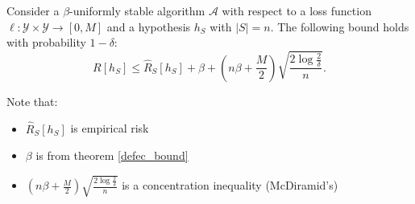 \documentclass{article}
\begin{document}
\begin{thm}\label{risk_bound}
Consider a $\beta$-uniformly stable algorithm $\mathcal{A}$ with respect to a loss function $\ell: \mathcal{Y} \times \mathcal{Y} \rightarrow [0, M]$ and a hypothesis $h_S$ with $|S| = n$. The following bound holds with probability $1-\delta$: 
\[
R[h_S] \leq \hat{R}_S[h_S] + \beta + \left(n\beta + \frac{M}{2} \right) \sqrt{\frac{2\log\frac{2}{\delta}}{n}}.
\]
\end{thm}
Note that:
\begin{itemize}
    \item $\hat{R}_S[h_S]$ is empirical risk
    \item $\beta$ is from theorem \ref{defec_bound}
    \item $\left(n\beta + \frac{M}{2} \right) \sqrt{\frac{2\log\frac{2}{\delta}}{n}}$ is a concentration inequality (McDiramid's)
\end{itemize}
\end{document}
